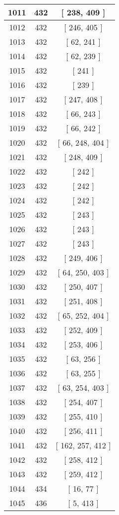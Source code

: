 \begin{center}
\begin{longtable}[H]{|| c c c ||}
\hline
1011 & 432 & [ 238, 409 ] \\ 
\hline
1012 & 432 & [ 246, 405 ] \\ 
\hline
1013 & 432 & [ 62, 241 ] \\ 
\hline
1014 & 432 & [ 62, 239 ] \\ 
\hline
1015 & 432 & [ 241 ] \\ 
\hline
1016 & 432 & [ 239 ] \\ 
\hline
1017 & 432 & [ 247, 408 ] \\ 
\hline
1018 & 432 & [ 66, 243 ] \\ 
\hline
1019 & 432 & [ 66, 242 ] \\ 
\hline
1020 & 432 & [ 66, 248, 404 ] \\ 
\hline
1021 & 432 & [ 248, 409 ] \\ 
\hline
1022 & 432 & [ 242 ] \\ 
\hline
1023 & 432 & [ 242 ] \\ 
\hline
1024 & 432 & [ 242 ] \\ 
\hline
1025 & 432 & [ 243 ] \\ 
\hline
1026 & 432 & [ 243 ] \\ 
\hline
1027 & 432 & [ 243 ] \\ 
\hline
1028 & 432 & [ 249, 406 ] \\ 
\hline
1029 & 432 & [ 64, 250, 403 ] \\ 
\hline
1030 & 432 & [ 250, 407 ] \\ 
\hline
1031 & 432 & [ 251, 408 ] \\ 
\hline
1032 & 432 & [ 65, 252, 404 ] \\ 
\hline
1033 & 432 & [ 252, 409 ] \\ 
\hline
1034 & 432 & [ 253, 406 ] \\ 
\hline
1035 & 432 & [ 63, 256 ] \\ 
\hline
1036 & 432 & [ 63, 255 ] \\ 
\hline
1037 & 432 & [ 63, 254, 403 ] \\ 
\hline
1038 & 432 & [ 254, 407 ] \\ 
\hline
1039 & 432 & [ 255, 410 ] \\ 
\hline
1040 & 432 & [ 256, 411 ] \\ 
\hline
1041 & 432 & [ 162, 257, 412 ] \\ 
\hline
1042 & 432 & [ 258, 412 ] \\ 
\hline
1043 & 432 & [ 259, 412 ] \\ 
\hline
1044 & 434 & [ 16, 77 ] \\ 
\hline
1045 & 436 & [ 5, 413 ] \\ 

\end{longtable}
\end{center}
